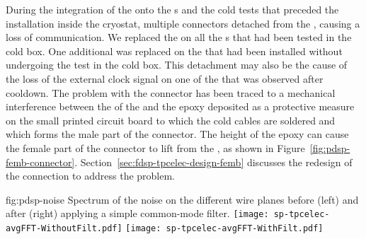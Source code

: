 \begin{comment}During the integration of the \dwords{femb} onto the \dword{apa}s 
and the cold tests that preceded the \dwords{apa} installation
inside the \dword{pdsp} cryostat a problem occurred %
on the 
connection between the cold readout and control cables and the
\dwords{femb}. In multiple cases the connector %
detached from
the \dword{femb} causing a loss of communication. 
\end{comment}
During the integration of the  onto the s 
and the cold tests that preceded the  installation
inside the  cryostat,  multiple connectors  
detached from
the , causing a loss of communication.  
We replaced the  %
on all the s that had been tested in the cold box. %
One additional  was 
replaced on the  that had been installed without undergoing 
the test in the cold box. This %
detachment may also be the cause
of the loss of the external clock signal on one of the 
that was observed after cooldown. %
%
The problem 
with the connector has been traced to a mechanical interference between 
the  of the  and the epoxy deposited as a protective measure on the small printed circuit
board to which the cold cables are soldered and which forms the 
male part of the connector. The height of the epoxy can cause 
the female part of the connector to lift from the ,
as shown in 
Figure~\ref{fig:pdsp-femb-connector}. %
Section~\ref{sec:fdsp-tpcelec-design-femb} discusses the redesign of the connection to address the problem.

\begin{dunefigure}
{fig:pdsp-noise}
{Spectrum of the noise on the different   wire planes before
(left) and after (right) applying a simple common-mode filter.}
\texttt{[image: sp-tpcelec-avgFFT-WithoutFilt.pdf]}
\texttt{[image: sp-tpcelec-avgFFT-WithFilt.pdf]}
\end{dunefigure}

